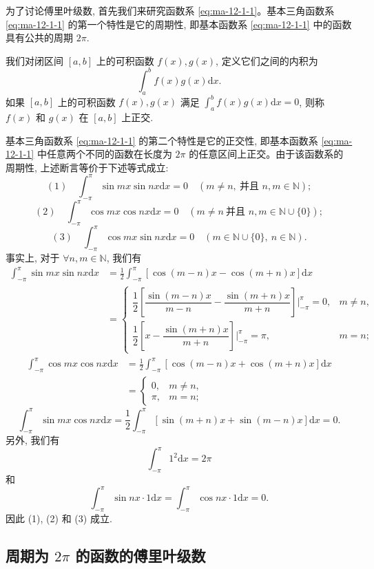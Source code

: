 为了讨论傅里叶级数, 首先我们来研究函数系 \eqref{eq:ma-12-1-1}。基本三角函数系 \eqref{eq:ma-12-1-1} 的第一个特性是它的周期性, 即基本函数系 \eqref{eq:ma-12-1-1} 中的函数具有公共的周期 $2\pi$.

我们对闭区间 $[a,b]$ 上的可积函数 $f(x),g(x)$, 定义它们之间的内积为
\[
  \int_a^b f(x)g(x)\mathrm dx.
\]
如果 $[a,b]$ 上的可积函数 $f(x),g(x)$ 满足 $\int_a^b f(x)g(x)\mathrm dx=0$, 则称 $f(x)$ 和 $g(x)$ 在 $[a,b]$ 上正交.

基本三角函数系 \eqref{eq:ma-12-1-1} 的第二个特性是它的正交性, 即基本函数系 \eqref{eq:ma-12-1-1} 中任意两个不同的函数在长度为 $2\pi$ 的任意区间上正交。由于该函数系的周期性, 上述断言等价于下述等式成立:
\[
  (1)\quad \int_{-\pi}^{\pi}\sin mx\sin nx\mathrm dx=0
  \quad (m\ne n,\ \text{并且 }n,m\in\mathbb N);
\]
\[
  (2)\quad \int_{-\pi}^{\pi}\cos mx\cos nx\mathrm dx=0
  \quad (m\ne n\ \text{并且 }n,m\in\mathbb N\cup\{0\});
\]
\[
  (3)\quad \int_{-\pi}^{\pi}\cos mx\sin nx\mathrm dx=0
  \quad (m\in\mathbb N\cup\{0\},\ n\in\mathbb N).
\]
事实上, 对于 $\forall n,m\in\mathbb N$, 我们有
\[
\begin{aligned}
  \int_{-\pi}^{\pi}\sin mx\sin nx\mathrm dx
  &=\frac12\int_{-\pi}^{\pi}[\cos(m-n)x-\cos(m+n)x]\mathrm dx \\
  &=
  \begin{cases}
    \dfrac12\left[\dfrac{\sin(m-n)x}{m-n}-\dfrac{\sin(m+n)x}{m+n}\right]\bigg|_{-\pi}^{\pi}=0,
      & m\ne n,\\[1.2em]
    \dfrac12\left[x-\dfrac{\sin(m+n)x}{m+n}\right]\bigg|_{-\pi}^{\pi}=\pi,
      & m=n;
  \end{cases}
\end{aligned}
\]
\[
\begin{aligned}
  \int_{-\pi}^{\pi}\cos mx\cos nx\mathrm dx
  &=\frac12\int_{-\pi}^{\pi}[\cos(m-n)x+\cos(m+n)x]\mathrm dx \\
  &=
  \begin{cases}
    0, & m\ne n,\\
    \pi, & m=n;
  \end{cases}
\end{aligned}
\]
\[
  \int_{-\pi}^{\pi}\sin mx\cos nx\mathrm dx
  =\frac12\int_{-\pi}^{\pi}[\sin(m+n)x+\sin(m-n)x]\mathrm dx=0.
\]
另外, 我们有
\[
  \int_{-\pi}^{\pi}1^2\mathrm dx=2\pi
\]
和
\[
  \int_{-\pi}^{\pi}\sin nx\cdot1\mathrm dx
  =\int_{-\pi}^{\pi}\cos nx\cdot1\mathrm dx=0.
\]
因此 (1), (2) 和 (3) 成立.

\subsection{\texorpdfstring{周期为 $2\pi$ 的函数的傅里叶级数}{周期为 2π 的函数的傅里叶级数}}
\label{subsec:ma-12-1-2}

